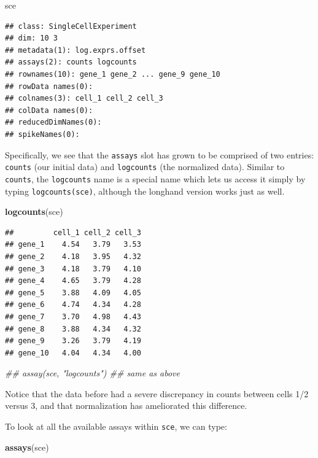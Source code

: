 \documentclass[]{book}
\newenvironment{Shaded}{\begin{snugshade}}{\end{snugshade}}
\newcommand{\CommentTok}[1]{\textcolor[rgb]{0.56,0.35,0.01}{\textit{#1}}}
\newcommand{\KeywordTok}[1]{\textcolor[rgb]{0.13,0.29,0.53}{\textbf{#1}}}
\newcommand{\NormalTok}[1]{#1}
\begin{document}
\begin{Shaded}
\begin{Highlighting}[]
\NormalTok{sce}
\end{Highlighting}
\end{Shaded}

\begin{verbatim}
## class: SingleCellExperiment 
## dim: 10 3 
## metadata(1): log.exprs.offset
## assays(2): counts logcounts
## rownames(10): gene_1 gene_2 ... gene_9 gene_10
## rowData names(0):
## colnames(3): cell_1 cell_2 cell_3
## colData names(0):
## reducedDimNames(0):
## spikeNames(0):
\end{verbatim}

Specifically, we see that the \texttt{assays} slot has grown to be comprised of two entries: \texttt{counts} (our initial data) and \texttt{logcounts} (the normalized data). Similar to \texttt{counts}, the \texttt{logcounts} name is a special name which lets us access it simply by typing \texttt{logcounts(sce)}, although the longhand version works just as well.

\begin{Shaded}
\begin{Highlighting}[]
\KeywordTok{logcounts}\NormalTok{(sce)}
\end{Highlighting}
\end{Shaded}

\begin{verbatim}
##         cell_1 cell_2 cell_3
## gene_1    4.54   3.79   3.53
## gene_2    4.18   3.95   4.32
## gene_3    4.18   3.79   4.10
## gene_4    4.65   3.79   4.28
## gene_5    3.88   4.09   4.05
## gene_6    4.74   4.34   4.28
## gene_7    3.70   4.98   4.43
## gene_8    3.88   4.34   4.32
## gene_9    3.26   3.79   4.19
## gene_10   4.04   4.34   4.00
\end{verbatim}

\begin{Shaded}
\begin{Highlighting}[]
\CommentTok{## assay(sce, "logcounts") ## same as above}
\end{Highlighting}
\end{Shaded}

Notice that the data before had a severe discrepancy in counts between cells 1/2 versus 3, and that normalization has ameliorated this difference.

To look at all the available assays within \texttt{sce}, we can type:

\begin{Shaded}
\begin{Highlighting}[]
\KeywordTok{assays}\NormalTok{(sce)}
\end{Highlighting}
\end{Shaded}
\end{document}
